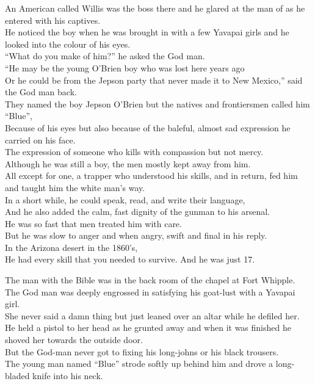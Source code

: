 An American called Willis was the boss there and he glared at the man of  as he entered with his captives. \\
He noticed the boy when he was brought in with a few Yavapai girls and he looked into the colour of his eyes. \\

``What do you make of him?'' he asked the God man. \\
``He may be the young O'Brien boy who was lost here years ago \\
Or he could be from the Jepson party that never made it to New Mexico,'' said the God man back. \\
They named the boy Jepson O'Brien but the natives and frontiersmen called him ``Blue'', \\
Because of his eyes but also because of the baleful, almost sad expression he carried on his face. \\
The expression of someone who kills with compassion but not mercy. \\

Although he was still a boy, the men mostly kept away from him. \\
All except for one, a trapper who understood his skills, and in return, fed him and taught him the white man's way. \\
In a short while, he could speak, read, and write their language, \\
And he also added the calm, fast dignity of the gunman to his arsenal. \\

He was so fast that men treated him with care. \\
But he was slow to anger and when angry, swift and final in his reply. \\
In the Arizona desert in the 1860's, \\
He had every skill that you needed to survive. And he was just 17. \\




The  man with the Bible was in the back room of the chapel at Fort Whipple. \\
The God man was deeply engrossed in satisfying his goat-lust with a Yavapai girl. \\
She never said a damn thing but just leaned over an altar while he defiled her. \\
He held a pistol to her head as he grunted away and when it was finished he shoved her towards the outside door. \\
But the God-man never got to fixing his long-johns or his black trousers. \\
The young man named ``Blue'' strode softly up behind him and drove a long-bladed knife into his neck. \\

